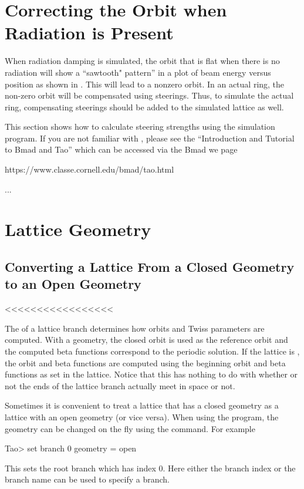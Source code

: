 \documentclass{hitec}     %
\newcommand{\Section}[1]{\section{#1}\vspace*{-1ex}}
\begin{document}
\Section{Correcting the Orbit when Radiation is Present}

When radiation damping is simulated, the orbit that is flat when there is no radiation will show a
``sawtooth" pattern'' in a plot of beam energy versus position as shown in . This will lead to a nonzero
orbit. In an actual ring, the non-zero orbit will be compensated using steerings. Thus, to
simulate the actual ring, compensating steerings should be added to the simulated lattice as well.

This section
shows how to calculate steering strengths using the  simulation program.  If you are not
familiar with , please see the ``Introduction and Tutorial to Bmad and Tao'' which can be
accessed via the Bmad we page
\begin{code}
  https://www.classe.cornell.edu/bmad/tao.html
\end{code}


\startEditingHere...



\Section{Lattice Geometry}
\label{s:geometry}

\subsection{Converting a Lattice From a Closed Geometry to an Open Geometry}
\label{s:openit}



<<<<<<<<<<<<<<<<<

The  of a lattice branch determines how orbits and Twiss parameters are computed. With
a  geometry, the closed orbit is used as the reference orbit and the computed beta
functions correspond to the periodic solution. If the lattice is , the orbit and beta
functions are computed using the beginning orbit and beta functions as set in the lattice. Notice
that this has nothing to do with whether or not the ends of the lattice branch actually meet in
space or not.

Sometimes it is convenient to treat a lattice that has a closed geometry as a lattice with an open
geometry (or vice versa). When using the \tao program, the geometry can be changed on the fly using
the  command. For example
\begin{code}
Tao> set branch 0 geometry = open
\end{code}
This sets the root branch which has index 0. Here either the branch index or the branch name can
be used to specify a branch.
\end{document}
